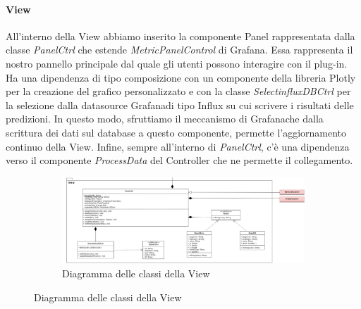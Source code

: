 \paragraph{View} \mbox{}
All'interno della View abbiamo inserito la componente Panel rappresentata dalla classe \textit{PanelCtrl} che estende \textit{MetricPanelControl} di Grafana\glo. Essa rappresenta il nostro pannello principale dal quale gli utenti possono interagire con il plug-in.
Ha una dipendenza di tipo composizione con un componente della libreria Plotly per la creazione del grafico personalizzato e con la classe \textit{SelectinfluxDBCtrl} per la selezione dalla datasource Grafana\glosp di tipo Influx su cui scrivere i risultati delle predizioni. In questo modo, sfruttiamo il meccanismo di Grafana\glosp che dalla scrittura dei dati sul database a questo componente, permette l'aggiornamento continuo della View.
Infine, sempre all'interno di \textit{PanelCtrl}, c'è una dipendenza verso il componente \textit{ProcessData} del Controller che ne permette il collegamento.
\mbox{}
\begin{landscape}
	\begin{figure}
		\begin{figure} [H]
			\includegraphics[width=\linewidth]{./img/Diagrammi/view-plug-in.png}
			\caption{Diagramma delle classi della View}
		\end{figure}
	\end{figure}
\end{landscape}
